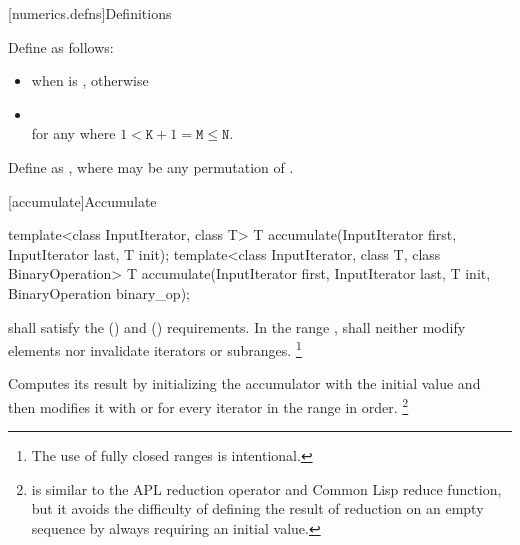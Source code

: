 [numerics.defns]{Definitions}

%
\pnum
Define 
as follows:
\begin{itemize}
\item
{} when  is , otherwise

\item
{} \\
for any  where $1 < \mathtt{K}+1 = \mathtt{M} \leq \mathtt{N}$.
\end{itemize}

%
\pnum
Define  as
,
where
 may be any permutation of .

[accumulate]{Accumulate}

%
\begin{itemdecl}
template<class InputIterator, class T>
  T accumulate(InputIterator first, InputIterator last, T init);
template<class InputIterator, class T, class BinaryOperation>
  T accumulate(InputIterator first, InputIterator last, T init,
               BinaryOperation binary_op);
\end{itemdecl}

\begin{itemdescr}
\pnum
\requires
{} shall satisfy
the  ()
and  () requirements.
In the range ,
 shall neither modify elements
nor invalidate iterators or subranges.%
\footnote{The use of fully closed ranges is intentional.}

\pnum
\effects
Computes its result by
initializing the accumulator  with the initial value 
and then modifies it with
 or
for every iterator  in the range  in order.%
\footnote{ is similar
to the APL reduction operator and Common Lisp reduce function,
but it avoids the difficulty of defining the result of reduction
on an empty sequence by always requiring an initial value.}
\end{itemdescr}

